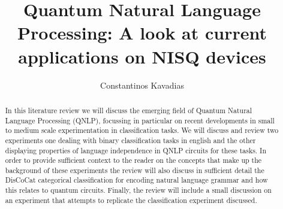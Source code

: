 \documentclass[a4paper,twocolumn,11pt]{quantumarticle}
\begin{document}
    \title{Quantum Natural Language Processing: A look at current applications on NISQ devices}

    \author{Constantinos Kavadias}

    \maketitle
    \begin{abstract}
    In this literature review we will discuss the emerging field of Quantum Natural Language Processing (QNLP), focussing
    in particular on recent developments in small to medium scale experimentation in classification tasks.
    We will discuss and review two experiments one dealing with binary classification tasks in english and the other
    displaying properties of language independence in QNLP circuits for these tasks.
    In order to provide sufficient context to the reader on the concepts that make up the background of these
    experiments the review will also discuss in sufficient detail the DisCoCat\cite{discocat} categorical classification
        for encoding natural language grammar and how this relates to quantum circuits.
    Finally, the review will include a small discussion on an experiment that attempts to replicate the classification
        experiment discussed.
    \end{abstract}
\end{document}
